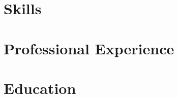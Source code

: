 \documentclass[10pt]{article} %
\begin{document}
\section{Skills}


\vspace{0.6em}
\section{Professional Experience}


\vspace{0.25em}

\vspace{0.25em}


\vspace{0.6em}
\section{Education}

\end{document}
